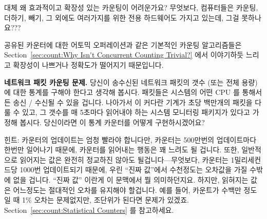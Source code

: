 \begin{enumerate}
\QuickQ{}
	대체 왜 효과적이고 확장성 있는 카운팅이 어려운가요?
	무엇보다, 컴퓨터들은 카운팅, 더하기, 빼기, 그 외에도 여러가지를 위한
	전용 하드웨어도 가지고 있는데, 그걸 못하나요???

\QuickA{}
	공유된 카운터에 대한 어토믹 오퍼레이션과 같은 기본적인 카운팅
	알고리즘들은 Section~\ref{sec:count:Why Isn't Concurrent Counting
	Trivial?} 에서 이야기하듯 느리고 확장성이 나쁘거나 정확도가 떨어지기
	때문입니다.

\QuickQ{}
	{ \bfseries 네트워크 패킷 카운팅 문제. }
	당신이 송수신된 네트워크 패킷의 갯수 (또는 전체 용량) 에 대한 통계를
	구해야 한다고 생각해 봅시다.
	패킷들은 시스템의 어떤 CPU 를 통해서든 송신 / 수신될 수 있을 겁니다.
	나아가서 이 커다란 기계가 초당 백만개의 패킷을 다룰 수 있고, 그 갯수를
	매 5초마다 읽어내야 하는 시스템 모니터링 패키지가 있다고 가정해 봅시다.
	당신이라면 이 통계 카운터를 어떻게 구현하시겠어요?

\QuickA{}
	힌트: 카운터의 업데이트는 엄청 빨라야 합니다만, 카운터는 500만번의
	업데이트마다 한번만 일어나기 때문에, 카운터를 읽어내는 행동은 꽤 느려도
	될 겁니다.
	또한, 일반적으로 읽어지는 값은 완전히 정교하진 않아도
	될겁니다---무엇보다, 카운터는 1밀리세컨드당 1000번 업데이트되기 때문에,
	우린 ``진짜 값''에서 수천정도는 오차값을 가질 수밖에 없을 겁니다.
	``진짜 값'' 이란게 이 문맥에서 뭘 의미하던지요.
	하지만, 읽혀지는 값은 어느정도는 절대적인 오차를 유지해야 할겁니다.
	예를 들어, 카운트가 수백만 정도일 때 1\% 오차는 문제없지만, 조단위가
	된다면 문제가 있겠죠.
	Section~\ref{sec:count:Statistical Counters} 를 참고하세요.


\end{enumerate}

